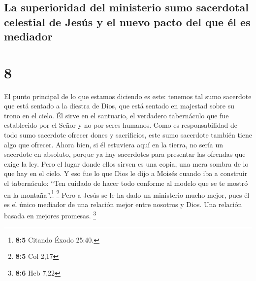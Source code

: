 \hypertarget{la-superioridad-del-ministerio-sumo-sacerdotal-celestial-de-jesuxfas-y-el-nuevo-pacto-del-que-uxe9l-es-mediador}{%
\subsection{La superioridad del ministerio sumo sacerdotal celestial de
Jesús y el nuevo pacto del que él es
mediador}\label{la-superioridad-del-ministerio-sumo-sacerdotal-celestial-de-jesuxfas-y-el-nuevo-pacto-del-que-uxe9l-es-mediador}}

\hypertarget{section-7}{%
\section{8}\label{section-7}}

 El punto principal de lo que estamos diciendo es este:
tenemos tal sumo sacerdote que está sentado a la diestra de Dios, que
está sentado en majestad sobre su trono en el cielo.  Él
sirve en el santuario, el verdadero tabernáculo que fue establecido por
el Señor y no por seres humanos.  Como es responsabilidad
de todo sumo sacerdote ofrecer dones y sacrificios, este sumo sacerdote
también tiene algo que ofrecer.  Ahora bien, si él
estuviera aquí en la tierra, no sería un sacerdote en absoluto, porque
ya hay sacerdotes para presentar las ofrendas que exige la ley.
 Pero el lugar donde ellos sirven es una copia, una mera
sombra de lo que hay en el cielo. Y eso fue lo que Dios le dijo a Moisés
cuando iba a construir el tabernáculo: ``Ten cuidado de hacer todo
conforme al modelo que se te mostró en la montaña''.\footnote{\textbf{8:5}
  Citando Éxodo 25:40.} \footnote{\textbf{8:5} Col 2,17} 
Pero a Jesús se le ha dado un ministerio mucho mejor, pues él es el
único mediador de una relación mejor entre nosotros y Dios. Una relación
basada en mejores promesas. \footnote{\textbf{8:6} Heb 7,22}

